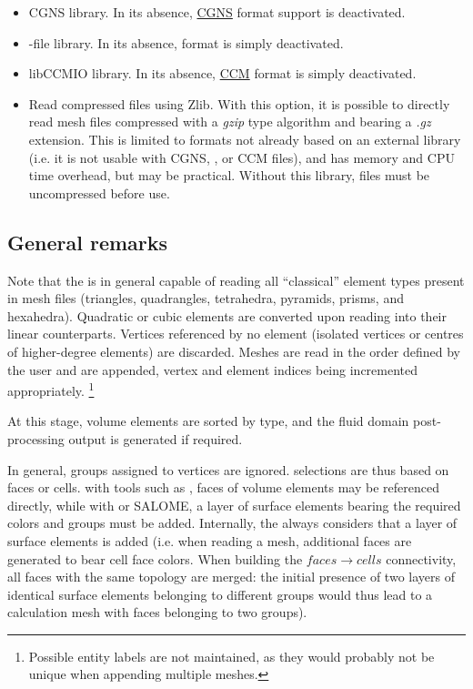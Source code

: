{{{\begin{itemize}

\item CGNS library. In its absence, \hyperref[sec:fmtdesc_cgns]{CGNS}
      format support is deactivated.

\item \med-file library. In its absence, \hyperref[sec:fmtdesc_med]{\med}
      format is simply deactivated.

\item libCCMIO library. In its absence, \hyperref[fmtdesc:ccm]{CCM}
      format is simply deactivated.

\item Read compressed files using Zlib. With this option, it is
      possible to directly read mesh files compressed with a
      \emph{gzip} type algorithm and bearing a \emph{.gz} extension.
      This is limited to formats not already based on an external
      library (i.e. it is not usable with CGNS, \med, or CCM files),
      and has memory and CPU time overhead, but may be practical.
      Without this library, files must be uncompressed before use.

\end{itemize}

\subsection{General remarks}

Note that the \pcs is in general capable of reading all ``classical''
element types present in mesh files (triangles, quadrangles, tetrahedra,
pyramids, prisms, and hexahedra).
Quadratic or cubic elements are converted upon reading into their
linear counterparts. Vertices referenced by no element (isolated vertices
or centres of higher-degree elements) are discarded. Meshes are read
in the order defined by the user and are appended, vertex and element
indices being incremented appropriately.
\footnote{Possible entity labels are not maintained, as they would
probably not be unique when appending multiple meshes.}

At this stage, volume elements are sorted by type, and the fluid domain
post-processing output is generated if required.

In general, groups assigned to vertices are ignored.
selections are thus based on faces or cells. with tools such
as \simail, faces of volume elements may be referenced directly, while
with \ideas or SALOME, a layer of surface elements bearing the required
colors and groups must be added. Internally, the \pcs always considers
that a layer of surface elements is added (i.e. when reading a \simail
mesh, additional faces are generated to bear cell face colors.
When building the $faces \rightarrow cells$ connectivity, all faces with the
same topology are merged: the initial presence of two layers of identical
surface elements belonging to different groups would thus lead to
a calculation mesh with faces belonging to two groups).

}}}
